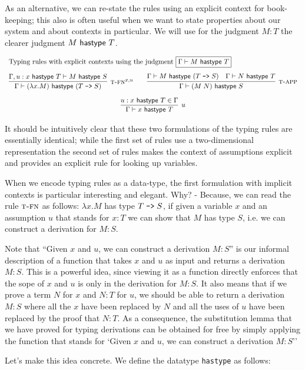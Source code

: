 As an alternative, we can re-state the rules using an explicit context for
book-keeping; this also is often useful when we want to state properties about
our system and about contexts in particular. We will use for the judgment $M:T$
the clearer judgment $M~\mathsf{hastype}~T$.



\[
\begin{array}{c}
\multicolumn{1}{l}{\mbox{Typing rules with explicit contexts using the judgment
    \fbox{$\Gamma \vdash \hasty M T$}}} \\[1em]
\infer[\TFn^{x,u}]{\Gamma \vdash \hasty {(\lambda x.M)} {(T \arrow S)}}{
  \Gamma, u:\hasty x T \vdash \hasty M S
}
\qquad
\infer[\TApp]{\Gamma \vdash \hasty {(M\;N)} S}{\Gamma \vdash \hasty M (T \arrow S)
  & \Gamma \vdash \hasty N T}\\[1em]
\infer[u]{\Gamma \vdash \hasty x T}{u:\hasty x T \in \Gamma}
\end{array}
\]

It should be intuitively clear that these two formulations of the typing rules
are essentially identical; while the first set of rules use a two-dimensional
representation the second set of rules makes the context of
assumptions explicit and provides an explicit rule for looking up variables.

When we encode typing rules as a data-type, the first formulation with implicit
contexts is particular interesting and elegant. Why? - Because, we can read the
rule $\textsc{t-fn}$ as follows: $\lambda x.M$ has type $T \mathrel{\texttt{->}} S$, if given a variable
$x$ and an assumption $u$ that stands for $x:T$ we can show that $M$ has type
$S$, i.e. we can construct a derivation for $M:S$.

Note that ``Given $x$ and $u$, we can construct a derivation $M:S$'' is our
informal description of a function that takes $x$ and $u$ as input and returns a
derivation $M:S$. This is a powerful idea, since viewing it as a function
directly enforces that the sope of $x$ and $u$ is only in the derivation for
$M:S$. It also means that if we prove a term $N$ for $x$ and $N:T$ for $u$, we
should be able to return a derivation $M:S$ where all the $x$ have been replaced
by $N$ and all the uses of $u$ have been replaced by the proof that $N:T$. As a
consequence, the substitution lemma that we have proved for typing derivations
can be obtained for free by simply applying the function that stands for `Given
$x$ and $u$, we can construct a derivation $M:S$''


Let's make this idea concrete. We define the datatype \lstinline!hastype! as
follows:

